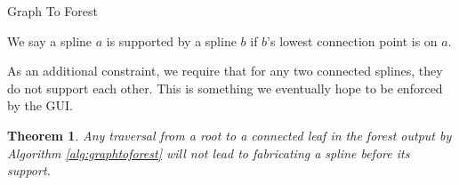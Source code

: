\documentclass[conference]{acmsiggraph}
\makeatletter
\def\BState{\State\hskip-\ALG@thistlm}
\newtheorem{theorem}{Theorem}[section]
\makeatother
\begin{document}
\begin{algorithm}
\caption{Graph To Forest}\label{alg:graphtoforest}
\end{algorithm}

We say a spline $a$ is supported by a spline $b$ if $b$'s lowest connection point is on $a$.

As an additional constraint, we require that for any two connected splines, they do not support each other.  This is something we eventually hope to be enforced by the GUI.

\begin{theorem}
Any traversal from a root to a connected leaf in the forest output by Algorithm \ref{alg:graphtoforest} will not lead to fabricating a spline before its support.
\end{theorem}
\end{document}
